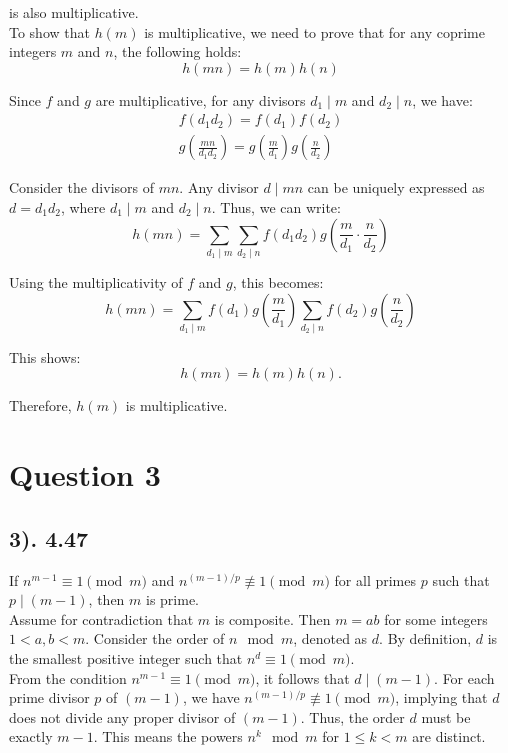 \documentclass[12pt]{article}
\begin{document}
is also multiplicative. \\

To show that \( h(m) \) is multiplicative, we need to prove that for any coprime integers \( m \) and \( n \), the following holds:
\[ 
    h(mn) = h(m)h(n)
\]

Since \( f \) and \( g \) are multiplicative, for any divisors \( d_1 \mid m \) and \( d_2 \mid n \), we have:
\begin{gather*}
    f(d_1 d_2) = f(d_1)f(d_2) \\
    g\left(\frac{mn}{d_1 d_2}\right) = g\left(\frac{m}{d_1}\right)g\left(\frac{n}{d_2}\right)
\end{gather*}

Consider the divisors of \( mn \). Any divisor \( d \mid mn \) can be uniquely expressed as \( d = d_1 d_2 \), where \( d_1 \mid m \) and \( d_2 \mid n \).
Thus, we can write:
\[
    h(mn) = \sum_{d_1 \mid m} \sum_{d_2 \mid n} f(d_1 d_2) g\left(\frac{m}{d_1} \cdot \frac{n}{d_2}\right)
\]

Using the multiplicativity of \( f \) and \( g \), this becomes:
\[
    h(mn) = \sum_{d_1 \mid m} f(d_1) g\left(\frac{m}{d_1}\right) 
    \sum_{d_2 \mid n} f(d_2) g\left(\frac{n}{d_2}\right)
\]

This shows:
\[ 
    h(mn) = h(m)h(n).
\]

Therefore, \( h(m) \) is multiplicative.

\section*{Question 3}
\subsection*{3). 4.47}
If $n^{m-1} \equiv 1 \pmod{m}$ and $n^{(m-1)/p} \not\equiv 1 \pmod{m}$ for all primes $p$ such that $p \mid (m-1)$, then $m$ is prime. \\

Assume for contradiction that $m$ is composite. Then $m = ab$ for some integers $1 < a, b < m$.
Consider the order of $n \mod m$, denoted as $d$. By definition, $d$ is the smallest positive integer such that $n^d \equiv 1 \pmod{m}$. \\

From the condition $n^{m-1} \equiv 1 \pmod{m}$, it follows that $d \mid (m-1)$.
For each prime divisor $p$ of $(m-1)$, we have $n^{(m-1)/p} \not\equiv 1 \pmod{m}$, implying that $d$ does not divide any proper divisor of $(m-1)$.
Thus, the order $d$ must be exactly $m-1$. This means the powers $n^k \mod m$ for $1 \leq k < m$ are distinct. \\
\end{document}
